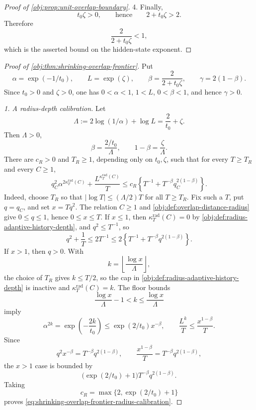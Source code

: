 \begin{proof}[Proof of \cref{obj:prop:unit-overlap-boundary}]
4. Finally,
\[
t_0\zeta>0,
\qquad\text{hence}\qquad
2+t_0\zeta>2.
\]
Therefore
\[
\frac{2}{2+t_0\zeta}<1,
\]
which is the asserted bound on the hidden-state exponent. %
\end{proof}

\begin{proof}[Proof of \cref{obj:thm:shrinking-overlap-frontier}]
Put
\[
\alpha=\exp(-1/t_0),\qquad L=\exp(\zeta),\qquad
\beta=\frac{2}{2+t_0\zeta},\qquad
\gamma=2(1-\beta).
\]
Since \(t_0>0\) and \(\zeta>0\), one has \(0<\alpha<1\), \(1<L\),
\(0<\beta<1\), and hence \(\gamma>0\).

\emph{1. A radius-depth calibration.}
Let
\[
\Lambda:=2\log(1/\alpha)+\log L=\frac{2}{t_0}+\zeta .
\]
Then \(\Lambda>0\),
\[
\beta=\frac{2/t_0}{\Lambda},
\qquad
1-\beta=\frac{\zeta}{\Lambda}.
\]
There are \(c_R>0\) and \(T_R\ge1\), depending only on \(t_0,\zeta\), such that for every \(T\ge T_R\) and every \(C\ge1\),
\begin{equation}\label{eq:shrinking-overlap-frontier-radius-calibration}
q_C^2\alpha^{2\kappa_T^{\mathrm{rad}}(C)}
+\frac{L^{\kappa_T^{\mathrm{rad}}(C)}}{T}
\le
c_R\left\{
T^{-1}+T^{-\beta}q_C^{2(1-\beta)}
\right\}.
\end{equation}
Indeed, choose \(T_R\) so that \(|\log T|\le(\Lambda/2)T\) for all
\(T\ge T_R\).  Fix such a \(T\), put \(q=q_C\), and set \(x=Tq^2\).
The relation \(C\ge1\) and \cref{obj:def:overlap-distance-radius} give
\(0\le q\le1\), hence \(0\le x\le T\).  If \(x\le1\), then
\(\kappa_T^{\mathrm{rad}}(C)=0\) by \cref{obj:def:radius-adaptive-history-depth}, and
\(q^2\le T^{-1}\), so
\[
q^2+\frac1T
\le 2T^{-1}
\le
2\left\{T^{-1}+T^{-\beta}q^{2(1-\beta)}\right\}.
\]
If \(x>1\), then \(q>0\).  With
\[
k=\left\lfloor\frac{\log x}{\Lambda}\right\rfloor ,
\]
the choice of \(T_R\) gives \(k\le T/2\), so the cap in
\cref{obj:def:radius-adaptive-history-depth} is inactive and
\(\kappa_T^{\mathrm{rad}}(C)=k\).  The floor bounds
\[
\frac{\log x}{\Lambda}-1<k\le\frac{\log x}{\Lambda}
\]
imply
\[
\alpha^{2k}
=\exp\!\left(-\frac{2k}{t_0}\right)
\le
\exp(2/t_0)x^{-\beta},
\qquad
\frac{L^k}{T}
\le
\frac{x^{1-\beta}}{T}.
\]
Since
\[
q^2x^{-\beta}
=
T^{-\beta}q^{2(1-\beta)},
\qquad
\frac{x^{1-\beta}}{T}
=
T^{-\beta}q^{2(1-\beta)},
\]
the \(x>1\) case is bounded by
\[
\bigl(\exp(2/t_0)+1\bigr)T^{-\beta}q^{2(1-\beta)}.
\]
Taking
\[
c_R=\max\{2,\exp(2/t_0)+1\}
\]
proves \cref{eq:shrinking-overlap-frontier-radius-calibration}. %


\end{proof}
